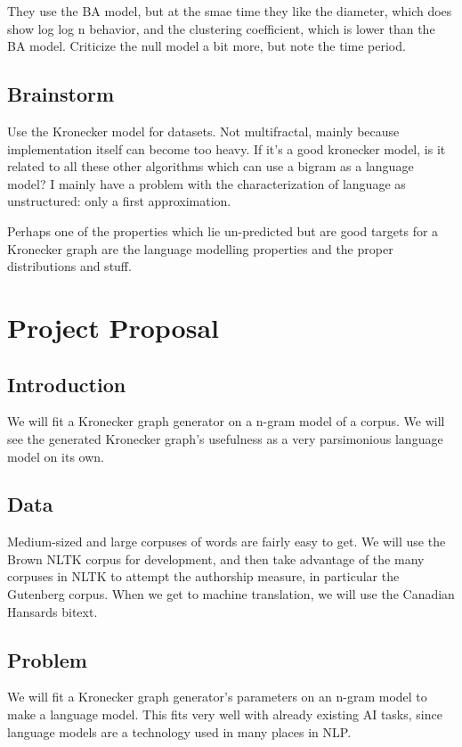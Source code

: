 \documentclass[12pt]{article}
\begin{document}
They use the BA model, but at the smae time they like the diameter, which does show log log n behavior, and the clustering coefficient, which is lower than the BA model. Criticize the null model a bit more, but note the time period.

\subsection{Brainstorm}

Use the Kronecker model for datasets. Not multifractal, mainly because implementation itself can become too heavy. If it's a good kronecker model, is it related to all these other algorithms which can use a bigram as a language model? I mainly have a problem with the characterization of language as unstructured: only a first approximation.

Perhaps one of the properties which lie un-predicted but are good targets for a Kronecker graph are the language modelling properties and the proper distributions and stuff.

\section{Project Proposal}

\subsection{Introduction}
We will fit a Kronecker graph generator on a n-gram model of a corpus. We will see the generated Kronecker graph's usefulness as a very parsimonious language model on its own.
\subsection{Data}
Medium-sized and large corpuses of words are fairly easy to get. We will use the Brown NLTK corpus for development, and then take advantage of the many corpuses in NLTK to attempt the authorship measure, in particular the Gutenberg corpus. When we get to machine translation, we will use the Canadian Hansards bitext.
\subsection{Problem}
We will fit a Kronecker graph generator's parameters on an n-gram model to make a language model. This fits very well with already existing AI tasks, since language models are a technology used in many places in NLP.
\end{document}

